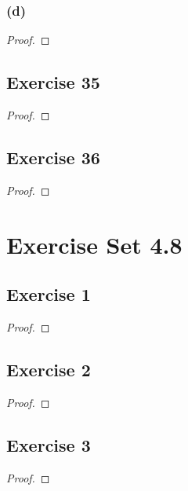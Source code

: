 \documentclass[14pt]{extarticle}
\begin{document}
\subsubsection{(d)}

\begin{proof}

\end{proof}

\subsection{Exercise 35}

\begin{proof}

\end{proof}

\subsection{Exercise 36}

\begin{proof}

\end{proof}

\section{Exercise Set 4.8}

\subsection{Exercise 1}

\begin{proof}

\end{proof}

\subsection{Exercise 2}

\begin{proof}

\end{proof}

\subsection{Exercise 3}

\begin{proof}

\end{proof}
\end{document}
